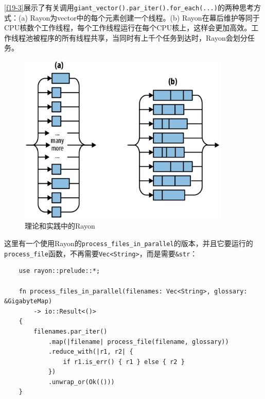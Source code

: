 \autoref{f19-3}展示了有关调用\texttt{giant\_vector().par\_iter().for\_each(...)}的两种思考方式：(a) Rayon为vector中的每个元素创建一个线程。(b) Rayon在幕后维护等同于CPU核数个工作线程，每个工作线程运行在每个CPU核上，这样会更加高效。工作线程池被程序的所有线程共享，当同时有上千个任务到达时，Rayon会划分任务。

\begin{figure}[htbp]
    \centering
    \includegraphics[width=0.9\textwidth]{../img/f19-3.png}
    \caption{理论和实践中的Rayon}
    \label{f19-3}
\end{figure}

这里有一个使用Rayon的\texttt{process\_files\_in\_parallel}的版本，并且它要运行的\texttt{process\_file}函数，不再需要\texttt{Vec<String>}，而是需要\texttt{\&str}：
\begin{verbatim}
    use rayon::prelude::*;

    fn process_files_in_parallel(filenames: Vec<String>, glossary: &GigabyteMap)
        -> io::Result<()>
    {
        filenames.par_iter()
            .map(|filename| process_file(filename, glossary))
            .reduce_with(|r1, r2| {
                if r1.is_err() { r1 } else { r2 }
            })
            .unwrap_or(Ok(()))
    }
\end{verbatim}

